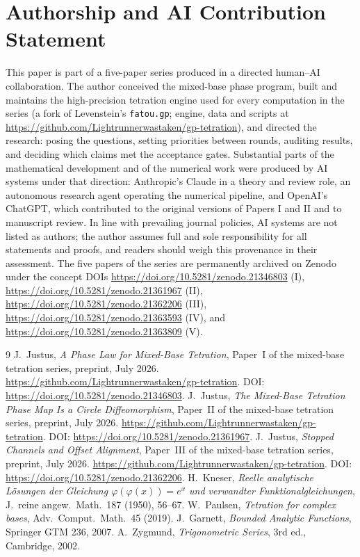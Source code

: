 \documentclass[11pt]{article}
\begin{document}
\section*{Authorship and AI Contribution Statement}
This paper is part of a five-paper series produced in a directed human--AI
collaboration. The author conceived the mixed-base phase program, built and
maintains the high-precision tetration engine used for every computation in
the series (a fork of Levenstein's \texttt{fatou.gp}; engine, data and
scripts at \url{https://github.com/Lightrunnerwastaken/gp-tetration}), and directed the research: posing the questions,
setting priorities between rounds, auditing results, and deciding which
claims met the acceptance gates. Substantial parts of the mathematical
development and of the numerical work were produced by AI systems under
that direction: Anthropic's Claude in a theory and review role, an
autonomous research agent operating the numerical pipeline, and OpenAI's
ChatGPT, which contributed to the original versions of Papers I and II and
to manuscript review. In line with prevailing journal policies, AI systems
are not listed as authors; the author assumes full and sole responsibility
for all statements and proofs, and readers should weigh this provenance in
their assessment. The five papers of the series are permanently archived on Zenodo under the concept DOIs \url{https://doi.org/10.5281/zenodo.21346803} (I), \url{https://doi.org/10.5281/zenodo.21361967} (II), \url{https://doi.org/10.5281/zenodo.21362206} (III), \url{https://doi.org/10.5281/zenodo.21363593} (IV), and \url{https://doi.org/10.5281/zenodo.21363809} (V).

\begin{thebibliography}{9}
 J.~Justus, \emph{A Phase Law for Mixed-Base Tetration}, Paper~I of the mixed-base tetration series, preprint, July 2026. \url{https://github.com/Lightrunnerwastaken/gp-tetration}. DOI: \url{https://doi.org/10.5281/zenodo.21346803}.
 J.~Justus, \emph{The Mixed-Base Tetration Phase Map Is a Circle Diffeomorphism}, Paper~II of the mixed-base tetration series, preprint, July 2026. \url{https://github.com/Lightrunnerwastaken/gp-tetration}. DOI: \url{https://doi.org/10.5281/zenodo.21361967}.
 J.~Justus, \emph{Stopped Channels and Offset Alignment}, Paper~III of the mixed-base tetration series, preprint, July 2026. \url{https://github.com/Lightrunnerwastaken/gp-tetration}. DOI: \url{https://doi.org/10.5281/zenodo.21362206}.
 H.~Kneser, \emph{Reelle analytische L\"osungen der
Gleichung $\varphi(\varphi(x))=e^x$ und verwandter Funktionalgleichungen},
J.~reine angew.~Math.\ 187 (1950), 56--67.
 W.~Paulsen, \emph{Tetration for complex bases}, Adv.\
Comput.\ Math.\ 45 (2019).
 J.~Garnett, \emph{Bounded Analytic Functions}, Springer
GTM 236, 2007.
 A.~Zygmund, \emph{Trigonometric Series}, 3rd ed.,
Cambridge, 2002.
\end{thebibliography}
\end{document}
